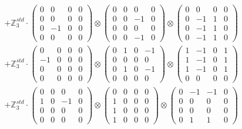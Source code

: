 \documentclass{article}
\begin{document}
{\begin{align}
    &+ \label{Rs12-Rc12-Solution-Transformed-c23} \mathbb{Z}_3^{std} \cdot 
        \begin{pmatrix} 0 & 0 & 0 & 0 \\ 0 & 0 & 0 & 0 \\ 0 & -1 & 0 & 0 \\ 0 & 0 & 0 & 0 \end{pmatrix} \otimes 
        \begin{pmatrix} 0 & 0 & 0 & 0 \\ 0 & 0 & -1 & 0 \\ 0 & 0 & 0 & 0 \\ 0 & 0 & -1 & 0 \end{pmatrix} \otimes 
        \begin{pmatrix} 0 & 0 & 0 & 0 \\ 0 & -1 & 1 & 0 \\ 0 & -1 & 1 & 0 \\ 0 & -1 & 1 & 0 \end{pmatrix} \\ 
    &+ \label{Rs12-Rc12-Solution-Transformed-c24} \mathbb{Z}_3^{std} \cdot 
        \begin{pmatrix} 0 & 0 & 0 & 0 \\ -1 & 0 & 0 & 0 \\ 0 & 0 & 0 & 0 \\ 0 & 0 & 0 & 0 \end{pmatrix} \otimes 
        \begin{pmatrix} 0 & 1 & 0 & -1 \\ 0 & 0 & 0 & 0 \\ 0 & 1 & 0 & -1 \\ 0 & 0 & 0 & 0 \end{pmatrix} \otimes 
        \begin{pmatrix} 1 & -1 & 0 & 1 \\ 1 & -1 & 0 & 1 \\ 1 & -1 & 0 & 1 \\ 0 & 0 & 0 & 0 \end{pmatrix} \\ 
    &+ \label{Rs12-Rc12-Solution-Transformed-c25} \mathbb{Z}_3^{std} \cdot 
        \begin{pmatrix} 0 & 0 & 0 & 0 \\ 1 & 0 & -1 & 0 \\ 0 & 0 & 0 & 0 \\ 0 & 0 & 0 & 0 \end{pmatrix} \otimes 
        \begin{pmatrix} 0 & 0 & 0 & 0 \\ 1 & 0 & 0 & 0 \\ 1 & 0 & 0 & 0 \\ 1 & 0 & 0 & 0 \end{pmatrix} \otimes 
        \begin{pmatrix} 0 & -1 & -1 & 0 \\ 0 & 0 & 0 & 0 \\ 0 & 0 & 0 & 0 \\ 0 & 1 & 1 & 0 \end{pmatrix} 
\end{align}
}
\end{document}
